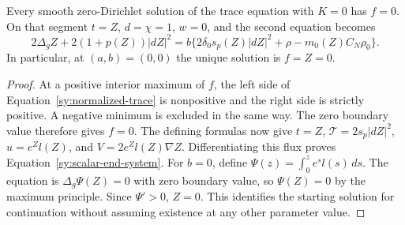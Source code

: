 \begin{lemma}\label{sy:zero-trace-reduction}
Every smooth zero-Dirichlet solution of the trace equation with $K=0$
has $f=0$.  On that segment $t=Z$, $d=\chi=1$, $w=0$, and the
second equation becomes
\begin{equation}\label{sy:scalar-end-system}
 2\Delta_gZ+2(1+p(Z))|dZ|^2
 =b\{2\delta_0s_p(Z)|dZ|^2+\rho-m_0(Z)C_N\rho_0\}.
\end{equation}
In particular, at $(a,b)=(0,0)$ the unique solution is $f=Z=0$.
\end{lemma}

\begin{proof}
At a positive interior maximum of $f$, the left side of
Equation~\ref{sy:normalized-trace} is nonpositive and the right side
is strictly positive.  A negative minimum is excluded in the same
way.  The zero boundary value therefore gives $f=0$.
The defining formulas now give $t=Z$,
$\mathcal T=2s_p|dZ|^2$, $u=e^Zl(Z)$, and
$V=2e^Zl(Z)\nabla Z$.  Differentiating this flux proves
Equation~\ref{sy:scalar-end-system}.
For $b=0$, define
$\Psi(z)=\int_0^z e^sl(s)\,ds$.  The equation is
$\Delta_g\Psi(Z)=0$ with zero boundary value, so
$\Psi(Z)=0$ by the maximum principle.  Since $\Psi'>0$, $Z=0$.
This identifies the starting solution for continuation without
assuming existence at any other parameter value.
\end{proof}
